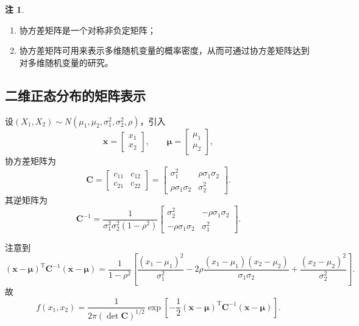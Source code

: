 \documentclass[11pt,a4paper]{report}
\theoremstyle{definition}
\newtheorem{note}{注}[chapter]
\begin{document}
\begin{note}
\begin{enumerate}[leftmargin=2em]
    \item 协方差矩阵是一个对称非负定矩阵；
    \item 协方差矩阵可用来表示多维随机变量的概率密度，从而可通过协方差矩阵达到对多维随机变量的研究。
\end{enumerate}
\end{note}

\subsection{二维正态分布的矩阵表示}

设$(X_{1},X_{2})\sim N(\mu_{1},\mu_{2},\sigma_{1}^{2},\sigma_{2}^{2},\rho)$，引入
\[
\boldsymbol{x}=\left[\begin{matrix}x_{1}\\x_{2}\end{matrix}\right],\qquad
\boldsymbol{\mu}=\left[\begin{matrix}\mu_{1}\\\mu_{2}\end{matrix}\right],
\]
协方差矩阵为
\[
\boldsymbol{C}=\left[\begin{matrix}
c_{11} & c_{12}\\
c_{21} & c_{22}
\end{matrix}\right]
=
\left[\begin{matrix}
\sigma_{1}^{2} & \rho\sigma_{1}\sigma_{2}\\
\rho\sigma_{1}\sigma_{2} & \sigma_{2}^{2}
\end{matrix}\right].
\]
其逆矩阵为
\[
\boldsymbol{C}^{-1}=\frac{1}{\sigma_{1}^{2}\sigma_{2}^{2}(1-\rho^{2})}
\left[\begin{matrix}
\sigma_{2}^{2} & -\rho\sigma_{1}\sigma_{2}\\
-\rho\sigma_{1}\sigma_{2} & \sigma_{1}^{2}
\end{matrix}\right].
\]

注意到
\[
(\boldsymbol{x}-\boldsymbol{\mu})^{\mathrm{T}}\boldsymbol{C}^{-1}(\boldsymbol{x}-\boldsymbol{\mu})
=\frac{1}{1-\rho^{2}}\left[\frac{(x_{1}-\mu_{1})^{2}}{\sigma_{1}^{2}}
-2\rho\frac{(x_{1}-\mu_{1})(x_{2}-\mu_{2})}{\sigma_{1}\sigma_{2}}
+\frac{(x_{2}-\mu_{2})^{2}}{\sigma_{2}^{2}}\right].
\]
故
\[
f(x_{1},x_{2})=\frac{1}{2\pi(\det\boldsymbol{C})^{1/2}}
\exp\left[-\frac{1}{2}(\boldsymbol{x}-\boldsymbol{\mu})^{\mathrm{T}}\boldsymbol{C}^{-1}(\boldsymbol{x}-\boldsymbol{\mu})\right].
\]
\end{document}
